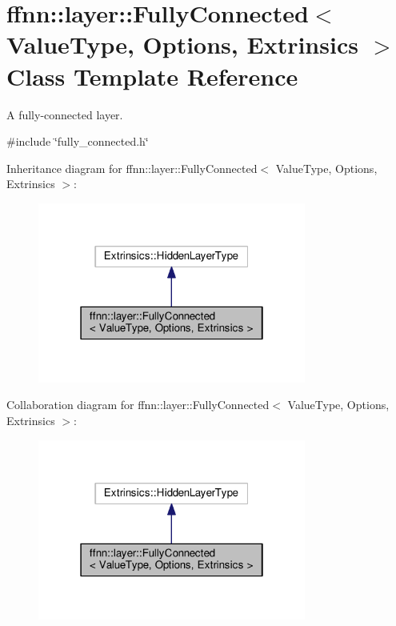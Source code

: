 \hypertarget{classffnn_1_1layer_1_1_fully_connected}{\section{ffnn\-:\-:layer\-:\-:Fully\-Connected$<$ Value\-Type, Options, Extrinsics $>$ Class Template Reference}
\label{classffnn_1_1layer_1_1_fully_connected}
}


A fully-\/connected layer.  




{\ttfamily \#include \char`\"{}fully\-\_\-connected.\-h\char`\"{}}



Inheritance diagram for ffnn\-:\-:layer\-:\-:Fully\-Connected$<$ Value\-Type, Options, Extrinsics $>$\-:
\nopagebreak
\begin{figure}[H]
\begin{center}
\leavevmode
\includegraphics[width=250pt]{classffnn_1_1layer_1_1_fully_connected__inherit__graph}
\end{center}
\end{figure}


Collaboration diagram for ffnn\-:\-:layer\-:\-:Fully\-Connected$<$ Value\-Type, Options, Extrinsics $>$\-:
\nopagebreak
\begin{figure}[H]
\begin{center}
\leavevmode
\includegraphics[width=250pt]{classffnn_1_1layer_1_1_fully_connected__coll__graph}
\end{center}
\end{figure}
